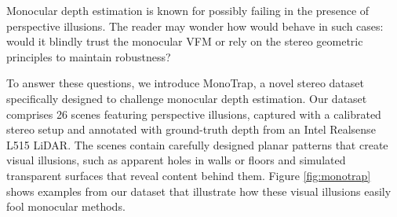 Monocular depth estimation is known for possibly failing in the presence of perspective illusions.
The reader may wonder how \method would behave in such cases: would it blindly trust the monocular VFM or rely on the stereo geometric principles to maintain robustness?

To answer these questions, we introduce MonoTrap, a novel stereo dataset specifically designed to challenge monocular depth estimation. Our dataset comprises 26 scenes featuring perspective illusions, captured with a calibrated stereo setup and annotated with ground-truth depth from an Intel Realsense L515 LiDAR.
The scenes contain carefully designed planar patterns that create visual illusions, such as apparent holes in walls or floors and simulated transparent surfaces that reveal content behind them. 
Figure \ref{fig:monotrap} shows examples from our dataset that illustrate how these visual illusions easily fool monocular methods. 

